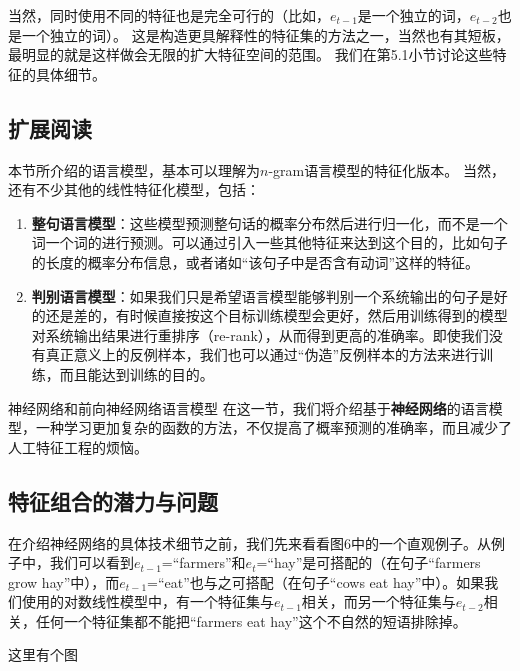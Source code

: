 \documentclass[10pt,a4paper]{ctexart}
\makeatletter
\renewcommand{\section}{\@startsection{section}{1}{0mm}
  {-\baselineskip}{0.5\baselineskip}{\bf\leftline}}
\makeatother
\begin{document}
当然，同时使用不同的特征也是完全可行的（比如，$e_{t-1}$是一个独立的词，$e_{t-2}$也是一个独立的词）。
这是构造更具解释性的特征集的方法之一，当然也有其短板，最明显的就是这样做会无限的扩大特征空间的范围。
我们在第5.1小节讨论这些特征的具体细节。

\subsection{扩展阅读}
本节所介绍的语言模型，基本可以理解为$n$-gram语言模型的特征化版本。
当然，还有不少其他的线性特征化模型，包括：
\begin{enumerate}
\item[] \textbf{整句语言模型}：这些模型预测整句话的概率分布然后进行归一化，而不是一个词一个词的进行预测。可以通过引入一些其他特征来达到这个目的，比如句子的长度的概率分布信息，或者诸如“该句子中是否含有动词”这样的特征。
\item[] \textbf{判别语言模型}：如果我们只是希望语言模型能够判别一个系统输出的句子是好的还是差的，有时候直接按这个目标训练模型会更好，然后用训练得到的模型对系统输出结果进行重排序（re-rank），从而得到更高的准确率。即使我们没有真正意义上的反例样本，我们也可以通过“伪造”反例样本的方法来进行训练，而且能达到训练的目的。
\end{enumerate}


\section{神经网络和前向神经网络语言模型}
在这一节，我们将介绍基于\textbf{神经网络}的语言模型，一种学习更加复杂的函数的方法，不仅提高了概率预测的准确率，而且减少了人工特征工程的烦恼。

\subsection{特征组合的潜力与问题}
在介绍神经网络的具体技术细节之前，我们先来看看图6中的一个直观例子。从例子中，我们可以看到$e_{t-1}$=“farmers”和$e_t$=“hay”是可搭配的（在句子“farmers grow hay”中），而$e_{t-1}$=“eat”也与之可搭配（在句子“cows eat hay”中）。如果我们使用的对数线性模型中，有一个特征集与$e_{t-1}$相关，而另一个特征集与$e_{t-2}$相关，任何一个特征集都不能把“farmers eat hay”这个不自然的短语排除掉。

这里有个图
\end{document}
